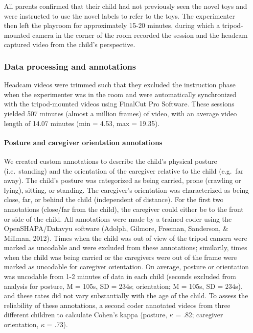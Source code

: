 \documentclass[english,man]{apa6}
\begin{document}
All parents confirmed that their child had not previously seen the novel
toys and were instructed to use the novel labels to refer to the toys.
The experimenter then left the playroom for approximately 15-20 minutes,
during which a tripod-mounted camera in the corner of the room recorded
the session and the headcam captured video from the child's perspective.

\subsubsection{Data processing and
annotations}\label{data-processing-and-annotations}

Headcam videos were trimmed such that they excluded the instruction
phase when the experimenter was in the room and were automatically
synchronized with the tripod-mounted videos using FinalCut Pro Software.
These sessions yielded 507 minutes (almost a million frames) of video,
with an average video length of 14.07 minutes (min = 4.53, max = 19.35).

\paragraph{Posture and caregiver orientation
annotations}\label{posture-and-caregiver-orientation-annotations}

We created custom annotations to describe the child's physical posture
(i.e.~standing) and the orientation of the caregiver relative to the
child (e.g.~far away). The child's posture was categorized as being
carried, prone (crawling or lying), sitting, or standing. The
caregiver's orientation was characterized as being close, far, or behind
the child (independent of distance). For the first two annotations
(close/far from the child), the caregiver could either be to the front
or side of the child. All annotations were made by a trained coder using
the OpenSHAPA/Datavyu software (Adolph, Gilmore, Freeman, Sanderson, \&
Millman, 2012). Times when the child was out of view of the tripod
camera were marked as uncodable and were excluded from these
annotations; similarily, times when the child was being carried or the
caregivers were out of the frame were marked as uncodable for caregiver
orientation. On average, posture or orientation was uncodable from 1-2
minutes of data in each child (seconds excluded from analysis for
posture, M = 105s, SD = 234s; orientation; M = 105s, SD = 234s), and
these rates did not vary substantially with the age of the child. To
assess the reliability of these annotations, a second coder annotated
videos from three different children to calculate Cohen's kappa
(posture, \(\kappa\) = .82; caregiver orientation, \(\kappa\) = .73).
\end{document}
